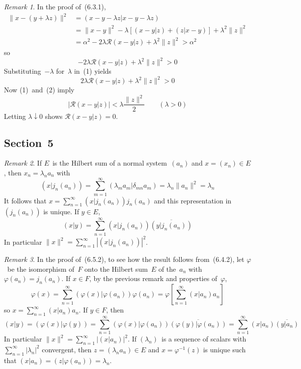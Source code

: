 \documentclass[letterpaper,12pt]{article}
\renewcommand{\Re}{\mathcal{R}}
\newcommand{\downto}{\downarrow}
\newcommand{\conj}[1]{\overline{#1}}
\newcommand{\inv}[1]{#1^{-1}}
\newcommand{\abs}[1]{|{#1}|}
\newcommand{\norm}[1]{\lVert{#1}\rVert}
\newcommand{\innerprod}[2]{({#1}|{#2})}
\theoremstyle{plain}
\theoremstyle{definition}
\theoremstyle{remark}
\newtheorem*{rmk}{Remark}
\begin{document}
\begin{rmk}
In the proof of~(6.3.1),
\begin{align*}
\norm{x-(y+\lambda z)}^2&=\innerprod{x-y-\lambda z}{x-y-\lambda z}\\
	&=\norm{x-y}^2-\lambda[\innerprod{x-y}{z}+\innerprod{z}{x-y}]+\lambda^2\norm{z}^2\\
	&=\alpha^2-2\lambda\Re\innerprod{x-y}{z}+\lambda^2\norm{z}^2>\alpha^2
\end{align*}
so
\[-2\lambda\Re\innerprod{x-y}{z}+\lambda^2\norm{z}^2>0\tag{1}\]
Substituting~\(-\lambda\) for~\(\lambda\) in~(1) yields
\[2\lambda\Re\innerprod{x-y}{z}+\lambda^2\norm{z}^2>0\tag{2}\]
Now (1)~and~(2) imply
\[\abs{\Re\innerprod{x-y}{z}}<\lambda\frac{\norm{z}^2}{2}\qquad(\lambda>0)\]
Letting \(\lambda\downto 0\) shows \(\Re\innerprod{x-y}{z}=0\).
\end{rmk}

\subsection*{Section~5}
\begin{rmk}
If \(E\)~is the Hilbert sum of a normal system~\((a_n)\) and \(x=(x_n)\in E\), then \(x_n=\lambda_n a_n\) with
\[\innerprod{x}{j_n(a_n)}=\sum_{m=1}^{\infty}\innerprod{\lambda_ma_m}{\delta_{mn}a_m}=\lambda_n\norm{a_n}^2=\lambda_n\]
It follows that \(x=\sum_{n=1}^{\infty}\innerprod{x}{j_n(a_n)}j_n(a_n)\) and this representation in~\((j_n(a_n))\) is unique. If \(y\in E\),
\[\innerprod{x}{y}=\sum_{n=1}^{\infty}\innerprod{x}{j_n(a_n)}\conj{\innerprod{y}{j_n(a_n)}}\]
In particular \(\norm{x}^2=\sum_{n=1}^{\infty}\abs{\innerprod{x}{j_n(a_n)}}^2\).
\end{rmk}

\begin{rmk}
In the proof of~(6.5.2), to see how the result follows from~(6.4.2), let \(\varphi\)~be the isomorphism of~\(F\) onto the Hilbert sum~\(E\) of the~\(a_n\) with \(\varphi(a_n)=j_n(a_n)\). If \(x\in F\), by the previous remark and properties of~\(\varphi\),
\[\varphi(x)=\sum_{n=1}^{\infty}\innerprod{\varphi(x)}{\varphi(a_n)}\varphi(a_n)=\varphi\left[\sum_{n=1}^{\infty}\innerprod{x}{a_n}a_n\right]\]
so \(x=\sum_{n=1}^{\infty}\innerprod{x}{a_n}a_n\). If \(y\in F\), then
\[\innerprod{x}{y}=\innerprod{\varphi(x)}{\varphi(y)}=\sum_{n=1}^{\infty}\innerprod{\varphi(x)}{\varphi(a_n)}\conj{\innerprod{\varphi(y)}{\varphi(a_n)}}=\sum_{n=1}^{\infty}\innerprod{x}{a_n}\conj{\innerprod{y}{a_n}}\]
In particular \(\norm{x}^2=\sum_{n=1}^{\infty}\abs{\innerprod{x}{a_n}}^2\). If \((\lambda_n)\)~is a sequence of scalars with \(\sum_{n=1}^{\infty}\abs{\lambda_n}^2\) convergent, then \(z=(\lambda_na_n)\in E\) and \(x=\inv{\varphi}(z)\) is unique such that \(\innerprod{x}{a_n}=\innerprod{z}{\varphi(a_n)}=\lambda_n\).
\end{rmk}
\end{document}

